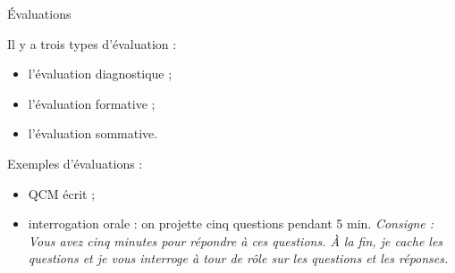 



\begin{header}
\'Evaluations
\end{header}

Il y a trois types d'évaluation :
\begin{itemize}
\item l'évaluation diagnostique ;
\item l'évaluation formative ;
\item l'évaluation sommative.
\end{itemize}

Exemples d'évaluations :
\begin{itemize}
\item QCM écrit ;
\item interrogation orale : on projette cinq questions pendant 5 min.
\emph{Consigne : \og Vous avez cinq minutes pour répondre à ces questions. \`A la fin, je cache les questions et je vous interroge à tour de rôle sur les questions et les réponses. \fg{} } 
\end{itemize}
